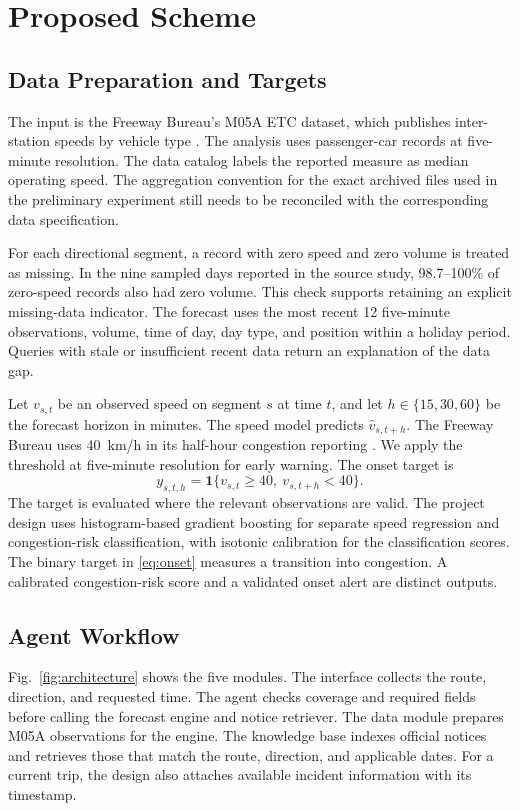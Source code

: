 \section{Proposed Scheme}


\subsection{Data Preparation and Targets}
The input is the Freeway Bureau's M05A ETC dataset, which publishes inter-station speeds by vehicle type \cite{fwbm05a}. The analysis uses passenger-car records at five-minute resolution. The data catalog labels the reported measure as median operating speed. The aggregation convention for the exact archived files used in the preliminary experiment still needs to be reconciled with the corresponding data specification.

For each directional segment, a record with zero speed and zero volume is treated as missing. In the nine sampled days reported in the source study, 98.7--100\% of zero-speed records also had zero volume. This check supports retaining an explicit missing-data indicator. The forecast uses the most recent 12 five-minute observations, volume, time of day, day type, and position within a holiday period. Queries with stale or insufficient recent data return an explanation of the data gap.

Let \(v_{s,t}\) be an observed speed on segment \(s\) at time \(t\), and let \(h\in\{15,30,60\}\) be the forecast horizon in minutes. The speed model predicts \(\hat v_{s,t+h}\). The Freeway Bureau uses 40~km/h in its half-hour congestion reporting \cite{fwb2026holiday}. We apply the threshold at five-minute resolution for early warning. The onset target is
\begin{equation}
y_{s,t,h} = \mathbf{1}\{v_{s,t}\geq40,\ v_{s,t+h}<40\}.
\label{eq:onset}
\end{equation}
The target is evaluated where the relevant observations are valid. The project design uses histogram-based gradient boosting for separate speed regression and congestion-risk classification, with isotonic calibration for the classification scores. The binary target in \eqref{eq:onset} measures a transition into congestion. A calibrated congestion-risk score and a validated onset alert are distinct outputs.

\subsection{Agent Workflow}
Fig.~\ref{fig:architecture} shows the five modules. The interface collects the route, direction, and requested time. The agent checks coverage and required fields before calling the forecast engine and notice retriever. The data module prepares M05A observations for the engine. The knowledge base indexes official notices and retrieves those that match the route, direction, and applicable dates. For a current trip, the design also attaches available incident information with its timestamp.

